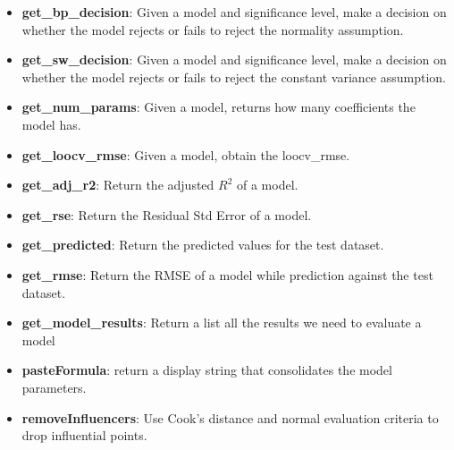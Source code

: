 \documentclass[
]{article}
\providecommand{\tightlist}{%
  \setlength{\itemsep}{0pt}\setlength{\parskip}{0pt}}
\begin{document}
\begin{itemize}
\tightlist
\item
  \textbf{get\_bp\_decision}: Given a model and significance level, make
  a decision on whether the model rejects or fails to reject the
  normality assumption.
\item
  \textbf{get\_sw\_decision}: Given a model and significance level, make
  a decision on whether the model rejects or fails to reject the
  constant variance assumption.
\item
  \textbf{get\_num\_params}: Given a model, returns how many
  coefficients the model has.
\item
  \textbf{get\_loocv\_rmse}: Given a model, obtain the loocv\_rmse.
\item
  \textbf{get\_adj\_r2}: Return the adjusted \(R^2\) of a model.
\item
  \textbf{get\_rse}: Return the Residual Std Error of a model.
\item
  \textbf{get\_predicted}: Return the predicted values for the test
  dataset.
\item
  \textbf{get\_rmse}: Return the RMSE of a model while prediction
  against the test dataset.
\item
  \textbf{get\_model\_results}: Return a list all the results we need to
  evaluate a model
\item
  \textbf{pasteFormula}: return a display string that consolidates the
  model parameters.
\item
  \textbf{removeInfluencers}: Use Cook's distance and normal evaluation
  criteria to drop influential points.
\end{itemize}
\end{document}
